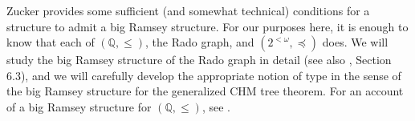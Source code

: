 Zucker \cite[Theorem 7.1]{Zucker-2019} provides some sufficient (and somewhat technical) conditions for a structure to admit a big Ramsey structure. For our purposes here, it is enough to know that each of $(\mathbb{Q},\leq)$, the Rado graph, and $(2^{<\omega},\preceq)$ does. We will study the big Ramsey structure of the Rado graph in detail (see also \cite{Zucker-2019}, Section 6.3), and we will carefully develop the appropriate notion of type in the sense of the big Ramsey structure for the generalized CHM tree theorem. For an account of a big Ramsey structure for $(\mathbb{Q},\leq)$, see \cite[Section 6.2]{Zucker-2019}.


